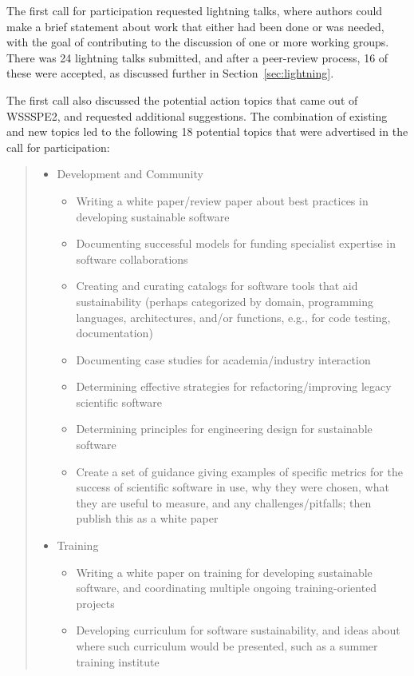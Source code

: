 \documentclass[11pt, oneside]{amsart}
\begin{document}
The first call for participation requested lightning talks, where authors could
make a brief statement about work that either had been done or was needed, with
the goal of contributing to the discussion of one or more working groups. There
was 24 lightning talks submitted, and after a peer-review process, 16 of these
were accepted, as discussed further in Section~\ref{sec:lightning}.

The first call also discussed the potential action topics that came out of
WSSSPE2, and requested additional suggestions. The combination of existing and
new topics led to the following 18 potential topics that were advertised in the
call for participation:


\begin{quote}
\begin{itemize}
\renewcommand{\labelenumi}{\textbf{\theenumi}.}
\setlength{\rightmargin}{1em}

\item Development and Community
\begin{itemize}
\item Writing a white paper/review paper about best practices in developing
sustainable software
\item Documenting successful models for funding specialist expertise in software
collaborations
\item Creating and curating catalogs for software tools that aid sustainability
(perhaps categorized by domain, programming languages, architectures, and/or
functions, e.g., for code testing, documentation)
\item Documenting case studies for academia/industry interaction
\item Determining effective strategies for refactoring/improving legacy
scientific software
\item Determining principles for engineering design for sustainable software
\item Create a set of guidance giving examples of specific metrics for the
success of scientific software in use, why they were chosen, what they are
useful to measure, and any challenges/pitfalls; then publish this as a white
paper
\end{itemize}

\item Training
\begin{itemize}
\item Writing a white paper on training for developing sustainable software, and
coordinating multiple ongoing training-oriented projects
\item Developing curriculum for software sustainability, and ideas about where
such curriculum would be presented, such as a summer training institute
\end{itemize}


\end{itemize}
\end{quote}
\end{document}
